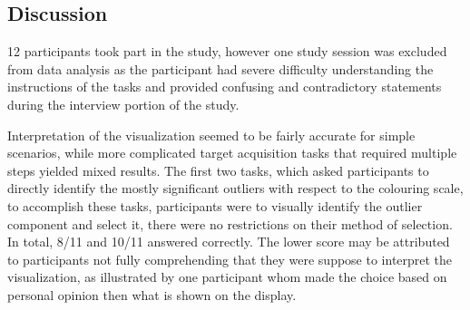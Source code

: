 %
%




\subsection{Discussion}
12 participants took part in the study, however one study session was excluded
from data analysis as the participant had severe difficulty understanding the
instructions of the tasks and provided confusing and contradictory statements
during the interview portion of the study.

Interpretation of the \threed visualization seemed to be fairly accurate for
simple scenarios, while more complicated target acquisition tasks that required
multiple steps yielded mixed results. The first two tasks, which asked
participants to directly identify the mostly significant outliers with respect
to the colouring scale, to accomplish these tasks, participants were to
visually identify the outlier \threed component and select it, there were
no restrictions on their method of selection. In total, 8/11 and 10/11 answered
correctly. The lower score may be attributed to participants not fully
comprehending that they were suppose to interpret the visualization, as
illustrated by one participant whom made the choice based on personal opinion
then what is shown on the display.

